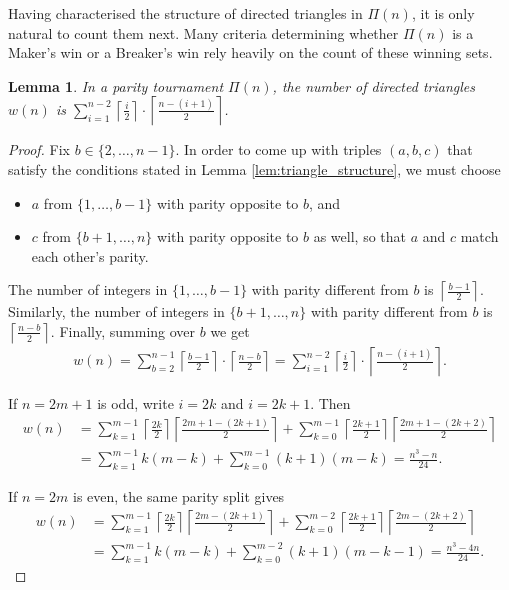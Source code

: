 \documentclass{article}
\theoremstyle{definition}
\theoremstyle{plain}
\newtheorem{lem}[theo]{Lemma}
\theoremstyle{remark}
\theoremstyle{definition}
\begin{document}
Having characterised the structure of directed triangles in $\Pi(n)$, it is only natural to count them next. Many criteria determining whether $\Pi(n)$ is a Maker's win or a Breaker's win rely heavily on the count of these winning sets.

\begin{lem}\label{lem:countwinning}
    In a parity tournament $\Pi(n)$, the number of directed triangles $w(n)$ is $\sum_{i=1}^{n-2} \left\lceil \frac{i}{2} \right\rceil \cdot \left\lceil \frac{n - (i+1)}{2} \right\rceil$.
\end{lem}
\begin{proof}
    Fix $b \in \{2, \dots, n-1\}$. In order to come up with triples $(a,b,c)$ that satisfy the conditions stated in Lemma \ref{lem:triangle_structure}, we must choose
    \begin{itemize}
        \item $a$ from $\{1, \dots, b-1\}$ with parity opposite to $b$, and
        \item $c$ from $\{b+1, \dots, n\}$ with parity opposite to $b$ as well, so that $a$ and $c$ match each other’s parity.
    \end{itemize}
    
    The number of integers in $\{1, \dots, b-1\}$ with parity different from $b$ is $\left\lceil \frac{b-1}{2} \right\rceil.$
    Similarly, the number of integers in $\{b+1, \dots, n\}$ with parity different from \( b \) is $\left\lceil \frac{n-b}{2} \right\rceil.$
    Finally, summing over $b$ we get
    \begin{align}
    w(n) = \sum_{b=2}^{n-1} \left\lceil \frac{b-1}{2} \right\rceil \cdot \left\lceil \frac{n-b}{2} \right\rceil
          = \sum_{i=1}^{n-2} \left\lceil \frac{i}{2} \right\rceil \cdot \left\lceil \frac{n-(i+1)}{2} \right\rceil.\nonumber
    \end{align}
    
    If $n=2m+1$ is odd, write $i=2k$ and $i=2k+1$. Then
    \begin{align*}
        w(n)
        &=\sum_{k=1}^{m-1}\left\lceil \frac{2k}{2}\right\rceil \left\lceil \frac{2m+1-(2k+1)}{2}\right\rceil
        +\sum_{k=0}^{m-1}\left\lceil \frac{2k+1}{2}\right\rceil \left\lceil \frac{2m+1-(2k+2)}{2}\right\rceil\\
        &=\sum_{k=1}^{m-1} k(m-k)+\sum_{k=0}^{m-1}(k+1)(m-k)
        =\frac{n^3-n}{24}.
    \end{align*}
    
    If $n=2m$ is even, the same parity split gives
    \begin{align*}
        w(n)
        &=\sum_{k=1}^{m-1}\left\lceil \frac{2k}{2}\right\rceil \left\lceil \frac{2m-(2k+1)}{2}\right\rceil
        +\sum_{k=0}^{m-2}\left\lceil \frac{2k+1}{2}\right\rceil \left\lceil \frac{2m-(2k+2)}{2}\right\rceil\\
        &=\sum_{k=1}^{m-1} k(m-k)+\sum_{k=0}^{m-2}(k+1)(m-k-1)
        =\frac{n^3-4n}{24}.
        \end{align*}
\end{proof}
\end{document}
